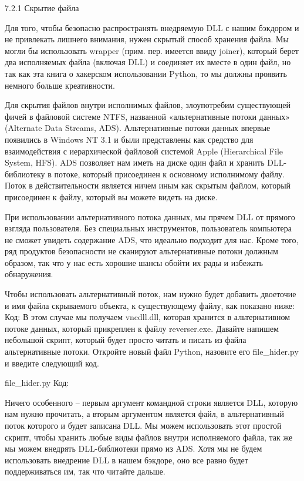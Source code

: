 \documentclass[12pt, a4paper, oneside]{book}
\begin{document}
7.2.1 Скрытие файла

Для того, чтобы безопасно распространять внедряемую DLL с нашим бэкдором и не привлекать лишнего внимания, нужен скрытый способ хранения файла. Мы могли бы использовать wrapper (прим. пер. имеется ввиду joiner), который берет два исполняемых файла (включая DLL) и соединяет их вместе в один файл, но так как эта книга о хакерском использовании Python, то мы должны проявить немного больше креативности.

Для скрытия файлов внутри исполнимых файлов, злоупотребим существующей фичей в файловой системе NTFS, названной «альтернативные потоки данных» (Alternate Data Streams, ADS). Альтернативные потоки данных впервые появились в Windows NT 3.1 и были представлены как средство для взаимодействия с иерархической файловой системой Apple (Hierarchical File System, HFS). ADS позволяет нам иметь на диске один файл и хранить DLL-библиотеку в потоке, который присоединен к основному исполнимому файлу. Поток в действительности является ничем иным как скрытым файлом, который присоединен к файлу, который вы можете видеть на диске.

При использовании альтернативного потока данных, мы прячем DLL от прямого взгляда пользователя. Без специальных инструментов, пользователь компьютера не сможет увидеть содержание ADS, что идеально подходит для нас. Кроме того, ряд продуктов безопасности не сканируют альтернативные потоки должным образом, так что у нас есть хорошие шансы обойти их рады и избежать обнаружения. 

Чтобы использовать альтернативный поток, нам нужно будет добавить двоеточие и имя файла скрываемого объекта, к существующему файлу, как показано ниже:
Код:
В этом случае мы получаем vncdll.dll, которая хранится в альтернативном потоке данных, который прикреплен к файлу reverser.exe. Давайте напишем небольшой скрипт, который будет просто читать и писать из файла альтернативные потоки. Откройте новый файл Python, назовите его file\_hider.py и введите следующий код.

file\_hider.py
Код:



Ничего особенного – первым аргумент командной строки является DLL, которую нам нужно прочитать, а вторым аргументом является файл, в альтернативный поток которого и будет записана DLL. Мы можем использовать этот простой скрипт, чтобы хранить любые виды файлов внутри исполняемого файла, так же мы можем внедрять DLL-библиотеки прямо из ADS. Хотя мы не будем использовать внедрение DLL в нашем бэкдоре, оно все равно будет поддерживаться им, так что читайте дальше. 
\end{document}
